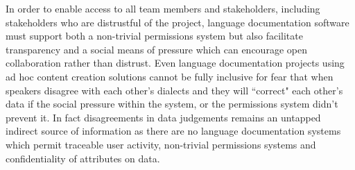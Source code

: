 \documentclass[11pt]{article}
\begin{document}
In order to enable access to all team members and stakeholders, including
stakeholders who are distrustful of the project, language documentation
software must support both a non-trivial permissions system but also facilitate
transparency and a social means of pressure which can encourage open
collaboration rather than distrust.  Even language documentation projects using
ad hoc content creation solutions cannot be fully inclusive for fear that when
speakers disagree with each other's dialects and they will ``correct"  each
other's data if the social pressure within the system, or the permissions system
didn't prevent it.  In fact disagreements in data judgements remains an
untapped  indirect source of information as there are no language documentation
systems which permit  traceable user activity, non-trivial permissions systems
and confidentiality of attributes on data.

\end{document}
